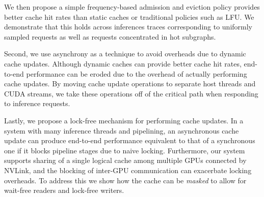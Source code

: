We then propose a simple frequency-based admission and eviction policy provides better cache hit rates than static caches or traditional policies such as LFU. We demonstrate that this holds across inferences traces corresponding to uniformly sampled requests as well as requests concentrated in hot subgraphs.

Second, we use asynchrony as a technique to avoid overheads due to dynamic cache updates. Although dynamic caches can provide better cache hit rates, end-to-end performance can be eroded due to the overhead of actually performing cache updates. By moving cache update operations to separate host threads and CUDA streams, we take these operations off of the critical path when responding to inference requests. 

Lastly, we propose a lock-free mechanism for performing cache updates. In a system with many inference threads and pipelining, an asynchronous cache update can produce end-to-end performance equivalent to that of a synchronous one if it blocks pipeline stages due to naive locking. Furthermore, our system supports sharing of a single logical cache among multiple GPUs connected by NVLink, and the blocking of inter-GPU communication can exacerbate locking overheads. To address this we show how the cache can be \textit{masked} to allow for wait-free readers and lock-free writers.

